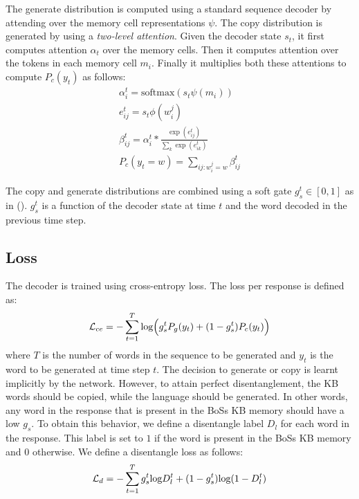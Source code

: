 The generate distribution is computed using a standard sequence decoder \cite{sutskever2014sequence} by attending \cite{luong2015effective} over the memory cell representations $\psi$. The copy distribution is generated by using a \textit{two-level attention}. Given the decoder state $s_t$, it first computes attention $\alpha_t$ over the memory cells. Then it computes attention over the tokens in each memory cell $m_i$. Finally it multiplies both these attentions to compute $P_c(y_t)$ as follows: 
\begin{gather}
\alpha_i^t = \text{softmax}(s_t \psi(m_i)) \\
e_{ij}^t = s_t \phi(w_i^j) \\
\beta^{t}_{ij} = \alpha^t_i * \frac{\exp({e_{ij}^t})}{\sum\nolimits_{k}\exp({e_{ik}^t})} \\
P_c(y_t=w)=\sum_{ij:w_i^j=w} \beta_{ij}^{t}
\end{gather}


The copy and generate distributions are combined using a soft gate $g_s^t \in [0,1]$ as in \citeauthor{see2017get} (\citeyear{see2017get}). $g_s^t$ is a function of the decoder state at time $t$ and the word decoded in the previous time step.

\subsection{Loss}
The decoder is trained using cross-entropy loss. The loss per response is defined as:
\begin{equation}
\mathcal{L}_{ce} = - \sum_{t=1}^{T} \textup{log} \Big( g_s^{t}P_g(y_t) + (1-g_s^{t})P_c(y_t) \Big) 
\end{equation}
where $T$ is the number of words in the sequence to be generated and $y_t$ is the word to be generated at time step $t$. The decision to generate or copy is learnt implicitly by the network. However, to attain perfect disentanglement, the KB words should be copied, while the language should be generated. In other words, any word in the response that is present in the {\sc BoSs} KB memory should have a low $g_s$. To obtain this behavior, we define a disentangle label $D_{l}$ for each word in the response. This label is set to $1$ if the word is present in the {\sc BoSs} KB memory and $0$ otherwise.
We define a disentangle loss as follows:
\begin{equation}
\mathcal{L}_{d} = - \sum_{t=1}^{T}  g_s^{t}\textup{log}D^{t}_{l} + (1-g_s^{t})\textup{log}(1-D^{t}_{l})
\end{equation}

